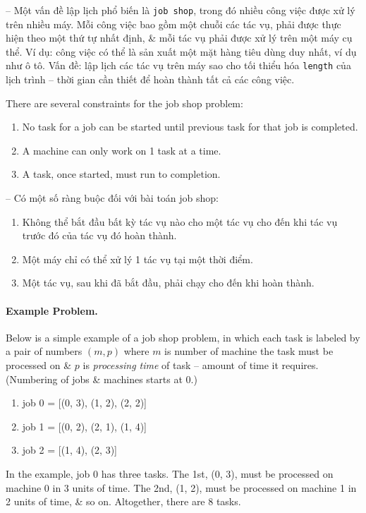 \documentclass{article}
\begin{document}
-- Một vấn đề lập lịch phổ biến là {\tt job shop}, trong đó nhiều công việc được xử lý trên nhiều máy. Mỗi công việc bao gồm một chuỗi các tác vụ, phải được thực hiện theo một thứ tự nhất định, \& mỗi tác vụ phải được xử lý trên một máy cụ thể. Ví dụ: công việc có thể là sản xuất một mặt hàng tiêu dùng duy nhất, ví dụ như ô tô. Vấn đề: lập lịch các tác vụ trên máy sao cho tối thiểu hóa {\tt length} của lịch trình -- thời gian cần thiết để hoàn thành tất cả các công việc.

There are several constraints for the job shop problem:
\begin{enumerate}
    \item No task for a job can be started until previous task for that job is completed.
    \item A machine can only work on 1 task at a time.
    \item A task, once started, must run to completion.
\end{enumerate}
-- Có một số ràng buộc đối với bài toán job shop:
\begin{enumerate}
    \item Không thể bắt đầu bất kỳ tác vụ nào cho một tác vụ cho đến khi tác vụ trước đó của tác vụ đó hoàn thành.
    \item Một máy chỉ có thể xử lý 1 tác vụ tại một thời điểm.
    \item Một tác vụ, sau khi đã bắt đầu, phải chạy cho đến khi hoàn thành.
\end{enumerate}

\paragraph{Example Problem.} Below is a simple example of a job shop problem, in which each task is labeled by a pair of numbers $(m,p)$ where $m$ is number of machine the task must be processed on \& $p$ is {\it processing time} of task -- amount of time it requires. (Numbering of jobs \& machines starts at 0.)
\begin{enumerate}
    \item job 0 = [(0, 3), (1, 2), (2, 2)]
    \item job 1 = [(0, 2), (2, 1), (1, 4)]
    \item job 2 = [(1, 4), (2, 3)]
\end{enumerate}
In the example, job 0 has three tasks. The 1st, (0, 3), must be processed on machine 0 in 3 units of time. The 2nd, (1, 2), must be processed on machine 1 in 2 units of time, \& so on. Altogether, there are 8 tasks.
\end{document}
